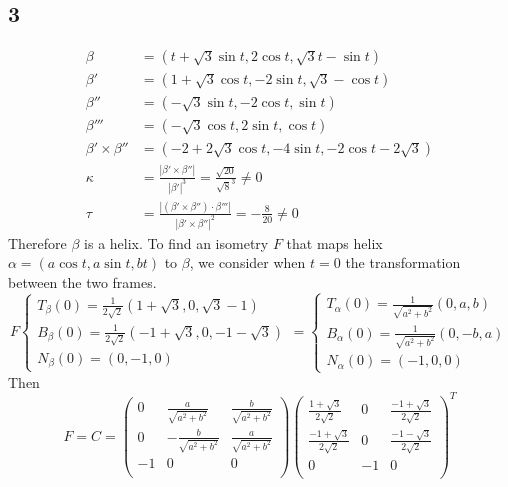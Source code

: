 \documentclass[12pt]{article}
\begin{document}
\subsection*{3}
$$ 
\begin{aligned}
	 \beta &= (t + \sqrt{3} \sin t, 2 \cos t, \sqrt{3}t - \sin t)  \\
	  \beta' &= (1 + \sqrt{3} \cos t, -2 \sin t, \sqrt{3} - \cos t) \\ 
	   \beta'' &= (- \sqrt{3} \sin t, -2\cos t, \sin t) \\
	   \beta''' &= (-\sqrt{3}\cos t, 2\sin t, \cos t) \\
	  \beta' \times \beta'' &= (-2 + 2\sqrt{3}\cos t, -4 \sin t, -2\cos t - 2 \sqrt{3}) \\
	  \kappa &= \frac{|\beta' \times \beta''| }{| \beta'|^3} = \frac{\sqrt{20}}{\sqrt{8}^3} \neq 0 \\
	  \tau &= \frac{|(\beta' \times \beta'' ) \cdot \beta '''| }{| \beta' \times \beta''|^2} = - \frac{8}{20} \neq 0
\end{aligned}
$$
Therefore $\beta$ is a helix.  To find an isometry $F$ that maps helix $\alpha = (a\cos t,  a \sin t, bt)$ to $\beta$, we consider when $t=0$ the transformation between the two frames.
$$
F \begin{cases}
	T_{\beta}(0) = \frac{1}{2\sqrt{2}} (1 + \sqrt{3}, 0, \sqrt{3} - 1)\\
	B_{\beta}(0) = \frac{1}{2\sqrt{2}}(-1 + \sqrt{3}, 0, -1 -\sqrt{3}) \\
	N_{\beta}(0) = (0, -1, 0)
	\end{cases}
=
\begin{cases}
T_{\alpha}(0) = \frac{1}{\sqrt{a^2+b^2}}(0, a, b) \\
B_{\alpha}(0) = \frac{1}{\sqrt{a^2 + b^2}}(0, -b, a) \\
N_{\alpha}(0) = (-1, 0, 0)
\end{cases}$$
Then $$
F =  C = 
\begin{pmatrix}
	0 & \frac{a}{\sqrt{a^2+b^2}} &  \frac{b}{\sqrt{a^2+b^2}} \\
	0 & - \frac{b}{\sqrt{a^2+b^2}} &  \frac{a}{\sqrt{a^2+b^2}} \\
	-1 & 0 & 0 \\
\end{pmatrix}
\begin{pmatrix}
	\frac{1 + \sqrt{3}}{2\sqrt{2}} & 0 &  \frac{- 1 + \sqrt{3} }{2\sqrt{2}} \\
	\frac{-1 + \sqrt{3}}{2\sqrt{2}} & 0 &  \frac{- 1 -\sqrt{3} }{2\sqrt{2}} \\
	0 & -1 & 0 \\
\end{pmatrix}^T
$$
\end{document}
